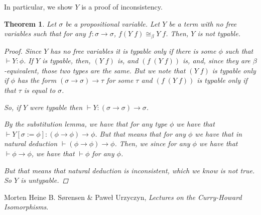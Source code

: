 \documentclass[12pt]{article}
\newtheorem{theorem}{Theorem}
\begin{document}
In particular, we show $Y$ is a proof of inconsistency. 
\begin{theorem}
Let $\sigma$ be a propositional variable. 
Let $Y$ be a term with no free variables such that for any $f\colon \sigma\to\sigma$,
$f(Y\; f) \cong_\beta Y\; f$. 
Then, $Y$ is not typable.
\begin{proof}
Since $Y$ has no free variables it is typable only if there is some $\phi$
such that $\vdash Y:\phi$. 
If $Y$ is typable, then, $(Y\; f)$ is, and $(f\;(Y\; f))$ is, and, since
they are $\beta$-equivalent, those two types are the same. 
But we note that $(Y\; f)$ is typable only if $\phi$ has the form 
$(\sigma\to\sigma)\to\tau$ for some $\tau$ and $(f\; (Y\; f))$ is 
typable only if that $\tau$ is equal to $\sigma$. 

So, if $Y$ were typable then $\vdash Y: (\sigma\to\sigma)\to\sigma$.

By the substitution lemma, we have that for any type $\phi$ we have that
$\vdash Y[\sigma:=\phi] : (\phi\to\phi)\to\phi$. 
But that means that for any $\phi$ we have that in natural deduction
$\vdash (\phi\to\phi)\to\phi$. 
Then, we since for any $\phi$ we have that $\vdash\phi\to\phi$,
we have that $\vdash\phi$ for any $\phi$.

But that means that natural deduction is inconsistent, which we know is not true.
So $Y$ is untypable. 
\end{proof} 
\end{theorem}

\begin{thebibliography}{}
\item
Morten Heine B. S{\o}rensen \& Pawe{\l} Urzyczyn, \textit{Lectures on the Curry-Howard Isomorphisms}. 
\end{thebibliography}
\end{document}
